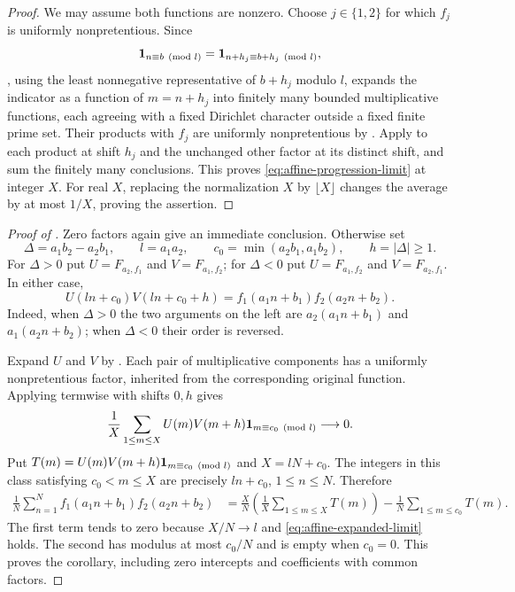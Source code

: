 \begin{proof}
We may assume both functions are nonzero. Choose $j\in\{1,2\}$ for
which $f_j$ is uniformly nonpretentious. Since
\[
 \mathbf 1_{n\equiv b\pmod l}
 =\mathbf 1_{n+h_j\equiv b+h_j\pmod l},
\]
, using the least nonnegative representative
of $b+h_j$ modulo $l$, expands the indicator as a function of
$m=n+h_j$ into finitely many bounded multiplicative functions, each
agreeing with a fixed Dirichlet character outside a fixed finite prime
set. Their products with $f_j$ are uniformly nonpretentious by
. Apply  to each product
at shift $h_j$ and the unchanged other factor at its distinct shift,
and sum the finitely many conclusions. This proves
\eqref{eq:affine-progression-limit} at integer $X$.
For real $X$, replacing the normalization $X$ by $\lfloor X\rfloor$
changes the average by at most $1/X$, proving the assertion.
\end{proof}

\begin{proof}[Proof of ]
Zero factors again give an immediate conclusion. Otherwise set
\begin{equation}
 \Delta=a_1b_2-a_2b_1,\qquad
 l=a_1a_2,\qquad
 c_0=\min(a_2b_1,a_1b_2),\qquad h=|\Delta|\ge1.
 \label{eq:affine-parameters}
\end{equation}
For $\Delta>0$ put
$U=F_{a_2,f_1}$ and $V=F_{a_1,f_2}$; for $\Delta<0$ put
$U=F_{a_1,f_2}$ and $V=F_{a_2,f_1}$. In either case,
\begin{equation}
 U(ln+c_0)V(ln+c_0+h)
 =f_1(a_1n+b_1)f_2(a_2n+b_2).
 \label{eq:affine-exact-identity}
\end{equation}
Indeed, when $\Delta>0$ the two arguments on the left are
$a_2(a_1n+b_1)$ and $a_1(a_2n+b_2)$; when $\Delta<0$ their order
is reversed.

Expand $U$ and $V$ by . Each pair of
multiplicative components has a uniformly nonpretentious factor,
inherited from the corresponding original function. Applying
 termwise with shifts $0,h$ gives
\begin{equation}
 \frac1X\sum_{1\le m\le X}
 U(m)V(m+h)\mathbf 1_{m\equiv c_0\pmod l}\longrightarrow0.
 \label{eq:affine-expanded-limit}
\end{equation}
Put $T(m)=U(m)V(m+h)\mathbf 1_{m\equiv c_0\pmod l}$ and $X=lN+c_0$.
The integers in this class satisfying $c_0<m\le X$ are precisely
$ln+c_0$, $1\le n\le N$. Therefore
\begin{align}
 \frac1N\sum_{n=1}^N f_1(a_1n+b_1)f_2(a_2n+b_2)
 &=\frac XN\left(\frac1X\sum_{1\le m\le X}T(m)\right)
   -\frac1N\sum_{1\le m\le c_0}T(m).
 \label{eq:affine-endpoints}
\end{align}
The first term tends to zero because $X/N\to l$ and
\eqref{eq:affine-expanded-limit} holds. The second has modulus at most
$c_0/N$ and is empty when $c_0=0$. This proves the corollary, including
zero intercepts and coefficients with common factors.
\end{proof}


